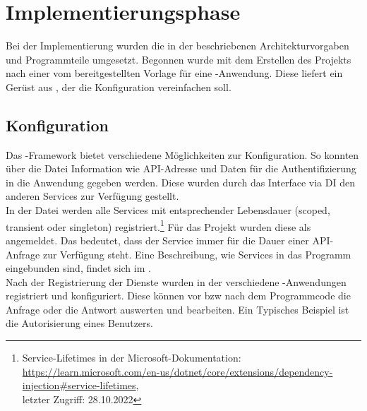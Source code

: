\section{Implementierungsphase} 
\label{sec:Implementierungsphase}
Bei der Implementierung wurden die in der  beschriebenen Architekturvorgaben
und Programmteile umgesetzt. Begonnen wurde mit dem Erstellen des Projekts nach einer vom 
bereitgestellten Vorlage für eine -Anwendung. Diese liefert ein Gerüst aus
, der \zB die Konfiguration vereinfachen soll.

\subsection{Konfiguration}
\label{sec:Konfiguration}
Das -Framework bietet verschiedene Möglichkeiten zur Konfiguration.
So konnten über die Datei  Information wie \acs{API}-Adresse und Daten für die
Authentifizierung in die Anwendung gegeben werden. Diese wurden durch das Interface 
via \acs{DI} den anderen Services zur Verfügung gestellt. \\
In der Datei  werden alle Services mit entsprechender Lebensdauer (scoped, transient oder singleton)
registriert.\footnote{Service-Lifetimes in der Microsoft-Dokumentation:\\
\url{https://learn.microsoft.com/en-us/dotnet/core/extensions/dependency-injection\#service-lifetimes},\\
letzter Zugriff: 28.10.2022}
Für das Projekt wurden diese als  angemeldet. Das bedeutet, dass der Service immer für die Dauer einer
\acs{API}-Anfrage zur Verfügung steht. Eine Beschreibung, wie Services in das Programm eingebunden sind, findet sich im 
.\\
Nach der Registrierung der Dienste wurden in der  verschiedene -An\-wen\-dung\-en 
registriert und konfiguriert. Diese können vor \acs{bzw} nach dem Programmcode die Anfrage oder die Antwort auswerten 
und bearbeiten. Ein Typisches Beispiel ist die Autorisierung eines Benutzers.

